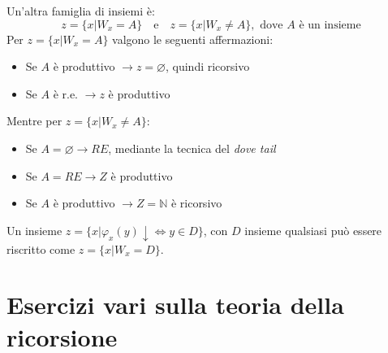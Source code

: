 \documentclass[a4paper,oneside]{scrbook}
\begin{document}
\noindent
Un'altra famiglia di insiemi è:
\begin{equation*}
    z=\{x|W_x=A\} \quad \text{e} \quad z=\{x|W_x\ne A\}, \text{ dove $A$ è un insieme}
\end{equation*}
Per $z=\{x|W_x=A\}$ valgono le seguenti affermazioni:
\begin{itemize}
    \item Se $A$ è produttivo $\rightarrow z=\varnothing$, quindi ricorsivo
    \item Se $A$ è r.e. $\rightarrow z$ è produttivo
\end{itemize}
Mentre per $z=\{x|W_x\ne A\}$:
\begin{itemize}
    \item Se $A=\varnothing \rightarrow RE$, mediante la tecnica del \textit{dove tail}
    \item Se $A=RE \rightarrow Z$ è produttivo
    \item Se $A$ è produttivo $\rightarrow Z=\mathbb{N}$ è ricorsivo
\end{itemize}

\noindent
Un insieme $z=\{x|\varphi_x(y)\downarrow \iff y\in D\}$, con $D$ insieme qualsiasi può essere riscritto come
$z=\{x|W_x=D\}$.

\chapter{Esercizi vari sulla teoria della ricorsione}
\end{document}
